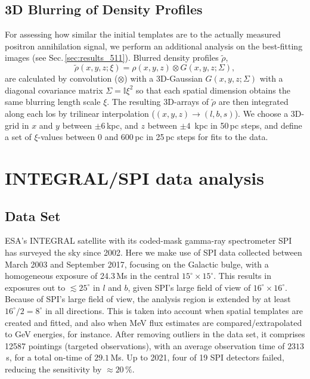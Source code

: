 \documentclass[doublespace,nopageskip]{VTthesis} %
\begin{document}
\subsection{3D Blurring of Density Profiles}\label{sec:blurring_maps}
%
For assessing how similar the initial templates are to the actually measured positron annihilation signal, we perform an additional analysis on the best-fitting images (see Sec.\,\ref{sec:results_511}).
%
Blurred density profiles $\tilde{\rho}$,
%
\begin{equation}
	\tilde{\rho}(x,y,z;\xi) = \rho(x,y,z) \otimes G(x,y,z;\Sigma)\mathrm{,} 
	\label{eq:3Dblurring}
\end{equation}
%
\noindent are calculated by convolution ($\otimes$) with a 3D-Gaussian  $G(x,y,z;\Sigma)$ with a diagonal covariance matrix $\Sigma = \mathbb{I}\xi^2$ so that each spatial dimension obtains the same blurring length scale $\xi$.
%
The resulting 3D-arrays of $\tilde{\rho}$ are then integrated along each los by trilinear interpolation ($(x,y,z) \rightarrow (l,b,s)$).
%
We choose a 3D-grid in $x$ and $y$ between $\pm 6$\,kpc, and $z$ between $\pm 4$\, kpc in 50\,pc steps, and define a set of $\xi$-values between 0 and 600\,pc in 25\,pc steps for fits to the data.




\section{INTEGRAL/SPI data analysis}\label{sec:data_analysis}
%
\subsection{Data Set}\label{sec:data_set}
%
ESA's INTEGRAL satellite \citep{2003A&A...411L...1W} with its coded-mask gamma-ray spectrometer SPI \citep{2003A&A...411L..63V} has surveyed the sky since 2002. 
%
Here we make use of SPI data collected between March 2003 and September 2017, focusing on the Galactic bulge, with a homogeneous exposure of 24.3\,Ms in the central $15^{\circ} \times 15^{\circ}$.
%
This results in exposures out to $\lesssim 25^{\circ}$ in $l$ and $b$, given SPI's large field of view of $16^{\circ} \times 16^{\circ}$. 
%
Because of SPI's large field of view, the analysis region is extended by at least $16^{\circ}/2 = 8^{\circ}$ in all directions.
%
This is taken into account when spatial templates are created and fitted, and also when MeV flux estimates are compared/extrapolated to GeV energies, for instance.
%
After removing outliers in the data set, it comprises 12587 pointings (targeted observations), with an average observation time of $2313$\,s, for a total on-time of $29.1$\,Ms.
%
Up to 2021, four of 19 SPI detectors failed, reducing the sensitivity by $\approx 20\,\%$.
\end{document}
